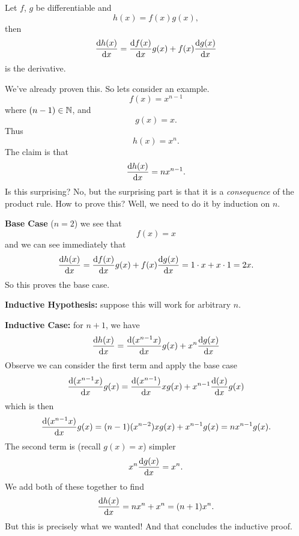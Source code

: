 \begin{thm}
Let $f$, $g$ be differentiable and
\begin{equation}
h(x)=f(x)g(x),
\end{equation}
then
\begin{equation}
\frac{\mathrm{d} h(x)}{\mathrm{d} x}=\frac{\mathrm{d} f(x)}{\mathrm{d} x}g(x)+f(x)\frac{\mathrm{d} g(x)}{\mathrm{d} x}
\end{equation}
is the derivative.
\end{thm}

We've already proven this. So lets consider an example.
\begin{equation}
f(x)=x^{n-1}
\end{equation}
where $(n-1)\in\mathbb{N}$, and
\begin{equation}
g(x)=x.
\end{equation}
Thus
\begin{equation}
h(x)=x^{n}.
\end{equation}
The claim is that
\begin{equation}
\frac{\mathrm{d} h(x)}{\mathrm{d} x}=nx^{n-1}.
\end{equation}
Is this surprising? No, but the surprising part is that it is a
\emph{consequence} of the product rule. How to prove this? Well,
we need to do it by induction on $n$.

\textbf{Base Case} ($n=2$) we see that
\begin{equation}
f(x)=x
\end{equation}
and we can see immediately that
\begin{equation}
\frac{\mathrm{d} h(x)}{\mathrm{d} x}=\frac{\mathrm{d} f(x)}{\mathrm{d} x}g(x)+f(x)\frac{\mathrm{d} g(x)}{\mathrm{d} x}=1\cdot x+x\cdot 1=2x.
\end{equation}
So this proves the base case.

\textbf{Inductive Hypothesis:} suppose this will work for
arbitrary $n$.

\textbf{Inductive Case:} for $n+1$, we have
\begin{equation}
\frac{\mathrm{d} h(x)}{\mathrm{d} x}=\frac{\mathrm{d} (x^{n-1}x)}{\mathrm{d} x}g(x)+x^{n}\frac{\mathrm{d} g(x)}{\mathrm{d} x}
\end{equation}
Observe we can consider the first term and apply the base case
\begin{equation}
\frac{\mathrm{d} (x^{n-1}x)}{\mathrm{d} x}g(x)=\frac{\mathrm{d} (x^{n-1})}{\mathrm{d} x}xg(x)+x^{n-1}\frac{\mathrm{d} (x)}{\mathrm{d} x}g(x)
\end{equation}
which is then
\begin{equation}
\frac{\mathrm{d} (x^{n-1}x)}{\mathrm{d} x}g(x)=(n-1)(x^{n-2})xg(x)+x^{n-1}g(x)=nx^{n-1}g(x).
\end{equation}
The second term is (recall $g(x)=x$) simpler
\begin{equation}
x^{n}\frac{\mathrm{d} g(x)}{\mathrm{d} x}=x^{n}.
\end{equation}
We add both of these together to find
\begin{equation}
\frac{\mathrm{d} h(x)}{\mathrm{d} x}=nx^{n}+x^{n}=(n+1)x^{n}.
\end{equation}
But this is precisely what we wanted! And that concludes the inductive proof.

